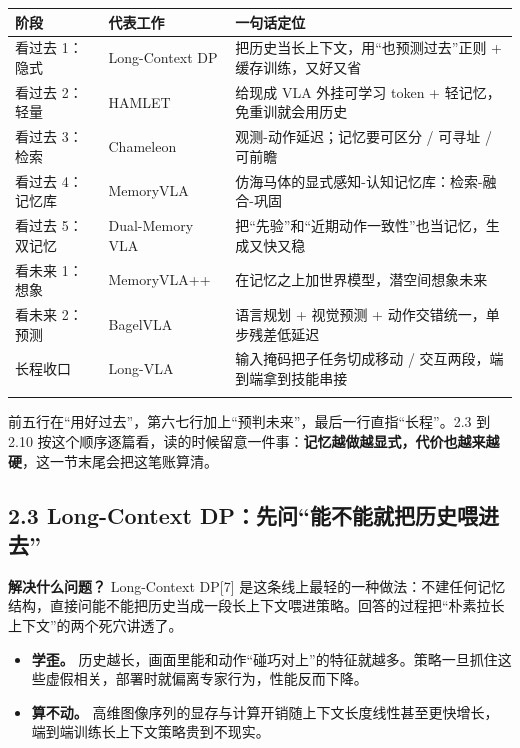 \documentclass[
  chinese,
]{ctexart}
\providecommand{\tightlist}{%
  \setlength{\itemsep}{0pt}\setlength{\parskip}{0pt}}
\begin{document}
\begin{center}
\begin{tabular}{@{}>{\raggedright\arraybackslash}p{} >{\raggedright\arraybackslash}p{} >{\raggedright\arraybackslash}p{}@{}}
\toprule\noalign{}
阶段 & 代表工作 & 一句话定位 \\
\midrule\noalign{}
看过去 1： 隐式 & Long-Context DP & 把历史当长上下文，用``也预测过去''正则 + 缓存训练，又好又省 \\
看过去 2： 轻量 & HAMLET & 给现成 VLA 外挂可学习 token + 轻记忆，免重训就会用历史 \\
看过去 3： 检索 & Chameleon & 观测-动作延迟；记忆要可区分 / 可寻址 / 可前瞻 \\
看过去 4： 记忆库 & MemoryVLA & 仿海马体的显式感知-认知记忆库：检索-融合-巩固 \\
看过去 5： 双记忆 & Dual-Memory VLA & 把``先验''和``近期动作一致性''也当记忆，生成又快又稳 \\
看未来 1： 想象 & MemoryVLA++ & 在记忆之上加世界模型，潜空间想象未来 \\
看未来 2： 预测 & BagelVLA & 语言规划 + 视觉预测 + 动作交错统一，单步残差低延迟 \\
长程收口 & Long-VLA & 输入掩码把子任务切成移动 / 交互两段，端到端拿到技能串接 \\
\bottomrule\noalign{}
\end{tabular}
\end{center}

前五行在``用好过去''，第六七行加上``预判未来''，最后一行直指``长程''。2.3
到 2.10
按这个顺序逐篇看，读的时候留意一件事：\textbf{记忆越做越显式，代价也越来越硬}，这一节末尾会把这笔账算清。

\subsection{2.3 Long-Context
DP：先问``能不能就把历史喂进去''}\label{long-context-dpux5148ux95eeux80fdux4e0dux80fdux5c31ux628aux5386ux53f2ux5582ux8fdbux53bb}

\textbf{解决什么问题？} Long-Context DP{[}7{]}
是这条线上最轻的一种做法：不建任何记忆结构，直接问能不能把历史当成一段长上下文喂进策略。回答的过程把``朴素拉长上下文''的两个死穴讲透了。

\begin{itemize}
\tightlist
\item
  \textbf{学歪。}
  历史越长，画面里能和动作``碰巧对上''的特征就越多。策略一旦抓住这些虚假相关，部署时就偏离专家行为，性能反而下降。
\item
  \textbf{算不动。}
  高维图像序列的显存与计算开销随上下文长度线性甚至更快增长，端到端训练长上下文策略贵到不现实。
\end{itemize}
\end{document}
